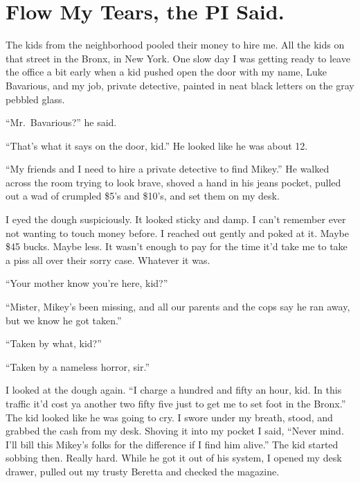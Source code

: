 \chapter{Flow My Tears, the PI Said.}


The kids from the neighborhood pooled their money to hire me. All
the kids on that street in the Bronx, in New York. One slow day I
was getting ready to leave the office a bit early when a kid pushed
open the door with my name, Luke Bavarious, and my job, private
detective, painted in neat black letters on the gray pebbled
glass.



``Mr.\ Bavarious?'' he said.

``That's what it says on the door, kid.'' He looked
like he was about 12.

``My friends and I need to hire a private detective to find
Mikey.'' He walked across the room trying to look brave,
shoved a hand in his jeans pocket, pulled out a wad of crumpled
\$5's and \$10's, and set them on my desk.



I eyed the dough suspiciously. It looked sticky and damp. I
can't remember ever not wanting to touch money before. I
reached out gently and poked at it. Maybe \$45 bucks. Maybe less. It
wasn't enough to pay for the time it'd take me to take
a piss all over their sorry case. Whatever it was.



``Your mother know you're here, kid?''

``Mister, Mikey's been missing, and all our parents and
the cops say he ran away, but we know he got taken.''

``Taken by what, kid?''

``Taken by a nameless horror, sir.''



I looked at the dough again. ``I charge a hundred and fifty an
hour, kid. In this traffic it'd cost ya another two fifty
five just to get me to set foot in the Bronx.'' The kid looked
like he was going to cry. I swore under my breath, stood, and
grabbed the cash from my desk. Shoving it into my pocket I said,
``Never mind. I'll bill this Mikey's folks for the
difference if I find him alive.'' The kid started sobbing
then. Really hard. While he got it out of his system, I opened my
desk drawer, pulled out my trusty Beretta and checked the
magazine.



